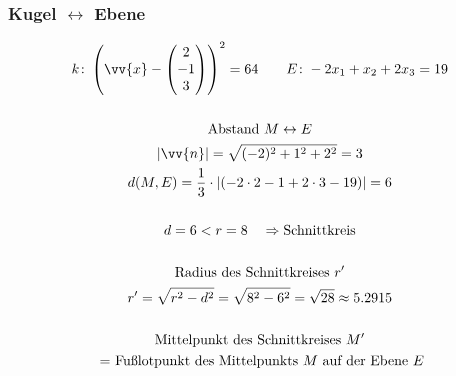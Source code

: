 \subsubsection{Kugel $\leftrightarrow$ Ebene}
\begin{gather*}
  k \colon \left(\vv{x} - \begin{pmatrix}2 \\ -1 \\ 3\end{pmatrix}\right)^2 = 64 \qquad E \colon -2x_1 + x_2 + 2x_3 = 19 \\\\
  \text{Abstand $M \leftrightarrow E$} \\
  |\vv{n}| = \sqrt{(-2)^2 + 1^2 + 2^2} = 3 \\
  d(M, E) = \frac{1}{3} \cdot \left|(-2 \cdot 2 - 1 + 2 \cdot 3 - 19)\right| = 6 \\\\
  d = 6 < r = 8 \quad\Rightarrow\text{Schnittkreis} \\\\
  \text{Radius des Schnittkreises $r'$} \\
  r' = \sqrt{r^2 - d^2} = \sqrt{8^2 - 6^2} = \sqrt{28} \approx 5.2915 \\\\
  \text{Mittelpunkt des Schnittkreises $M'$} \\
  \;\text{= Fußlotpunkt des Mittelpunkts $M$ auf der Ebene $E$}
\end{gather*}

